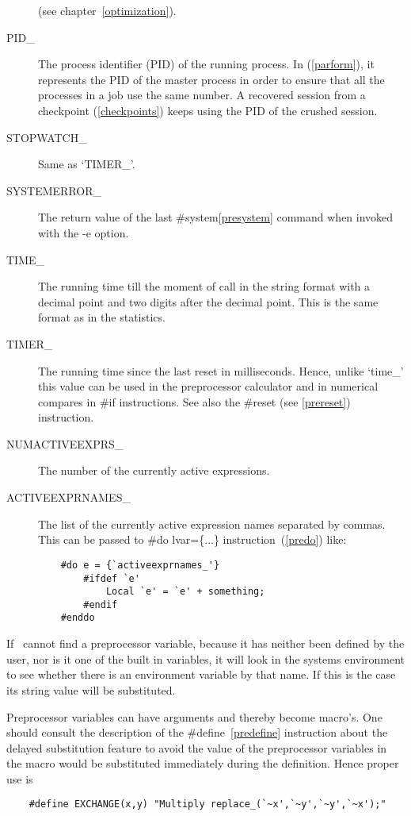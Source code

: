 \begin{description}
               (see chapter~\ref{optimization}).
\item[PID\_]         The process identifier (PID)   of
               the running process. In \ParFORM{} (\ref{parform}), it represents
               the PID of the master process in order to ensure that all the
               processes in a job use the same number. A recovered session from
               a checkpoint (\ref{checkpoints}) keeps using the PID of the
               crushed session.
\item[STOPWATCH\_] Same as `TIMER\_'.
\item[SYSTEMERROR\_] The return value of the last \#system\ref{presystem}
               command when invoked with the -e option.
\item[TIME\_]  The running time till the moment of call in the string format
               with a decimal point and two digits after the decimal point. 
               This is the same format as in the statistics.
\item[TIMER\_] The running time since the last reset in milliseconds. Hence, 
               unlike `time\_' this value can be used in the preprocessor 
               calculator and in numerical compares in \#if instructions.
               See also the \#reset (see \ref{prereset}) instruction.
\item[NUMACTIVEEXPRS\_]  The number of the currently active expressions.
\item[ACTIVEEXPRNAMES\_]  The list of the currently active expression names 
               separated by commas. This can be passed to \#do lvar=\{...\} 
               instruction~(\ref{predo}) like: 
\begin{verbatim}
    #do e = {`activeexprnames_'}
        #ifdef `e'
            Local `e' = `e' + something;
        #endif
    #enddo
\end{verbatim}
\end{description}

\noindent If \FORM\ cannot find a preprocessor variable, because it has 
neither been defined by the user, nor is it one of the built in variables, 
it will look in the systems environment to see whether 
there is an environment variable by that name. If this is the case its 
string value will be substituted.

\noindent Preprocessor variables can have arguments and thereby become 
macro's. One should consult the description of the \#define~\ref{predefine} 
instruction about the delayed substitution feature to avoid the value of 
the preprocessor variables in the macro would be substituted immediately 
during the definition. Hence proper use is
\begin{verbatim}
    #define EXCHANGE(x,y) "Multiply replace_(`~x',`~y',`~y',`~x');"
\end{verbatim}

